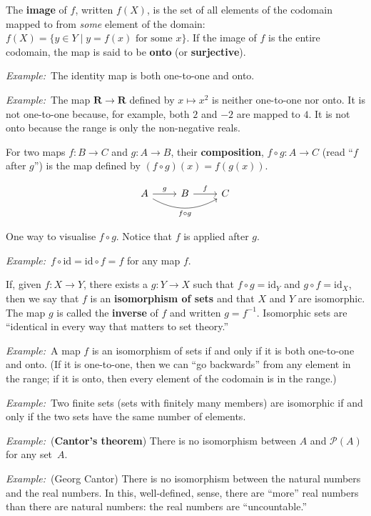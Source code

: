 \documentclass[12pt, a4paper]{article}
\newcommand{\defn}[1]{\textbf{#1}}
\newcommand{\set}[1]{\mathbold{#1}}
\newcommand{\eg}{\emph{Example:}\relax}
\newcommand{\id}{\text{id}}
\begin{document}
The \defn{image} of $f$, written $f(X)$, is the set of all elements of
the codomain mapped to from \emph{some} element of the domain: $f(X) =
\{y \in Y \mid \text{$y = f(x)$ for some $x$}\}$. If the image of $f$ is
the entire codomain, the map is said to be \defn{onto} (or
\defn{surjective}).

\eg\ The identity map is both one-to-one and onto.

\eg\ The map $\set{R}\to\set{R}$ defined by $x\mapsto x^2$ is neither
one-to-one nor onto. It is not one-to-one because, for example, both
$2$ and $-2$ are mapped to $4$. It is not onto because the range is
only the non-negative reals.  

For two maps $f\colon B \to C$ and $g\colon A \to B$, their
\defn{composition}, $f\circ g\colon A \to C$ (read “$f$ after $g$”) is the
map defined by $(f\circ g)(x) = f(g(x))$.

\begin{sidefigure}
  \[
  \begin{tikzcd}
    A \arrow [rr, bend right, "f \circ g"' ] \arrow[r, "g"] & B \arrow[r, "f"] & C 
  \end{tikzcd}
  \]
  \caption{One way to visualise $f \circ g$. Notice that $f$ is applied
    after $g$.}
\end{sidefigure}

\eg\ $f\circ\id = \id\circ f = f$ for any map $f$. 

If, given $f\colon X \to Y$, there exists a $g\colon Y \to X$ such that
$f\circ g = \id_Y$ and $g\circ f = \id_X$, then we say that $f$ is an
\defn{isomorphism of sets} and that $X$ and $Y$ are isomorphic. The
map $g$ is called the \defn{inverse} of $f$ and written $g =
f^{-1}$. Isomorphic sets are “identical in every way that matters to
set theory.”

\eg\ A map $f$ is an isomorphism of sets if and only if it is both
one-to-one and onto. (If it is one-to-one, then we can “go backwards”
from any element in the range; if it is onto, then every element of
the codomain is in the range.)

\eg\ Two finite sets (sets with finitely many members) are isomorphic
if and only if the two sets have the same number of elements.

\eg\ (\defn{Cantor's theorem}) There is no isomorphism between $A$ and
$\mathcal{P}(A)$ for any set~$A$.

\eg\ (Georg Cantor) There is no isomorphism between the natural
numbers and the real numbers. In this, well-defined, sense, there are
``more'' real numbers than there are natural numbers: the real numbers
are ``uncountable.''
\end{document}
